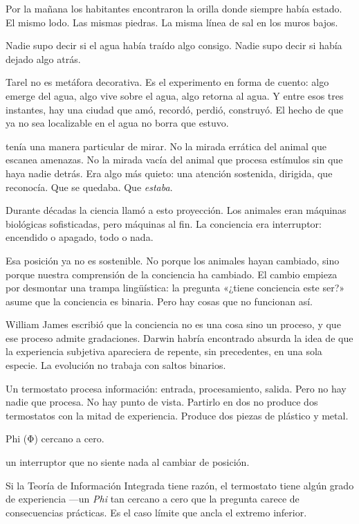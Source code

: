 Por la mañana los habitantes encontraron la orilla donde siempre había estado. El mismo lodo. Las mismas piedras. La misma línea de sal en los muros bajos.

Nadie supo decir si el agua había traído algo consigo. Nadie supo decir si había dejado algo atrás.

\begin{fisica}
 Tarel no es metáfora decorativa. Es el experimento en forma de cuento: algo emerge del agua, algo vive sobre el agua, algo retorna al agua. Y entre esos tres instantes, hay una ciudad que amó, recordó, perdió, construyó. El hecho de que ya no sea localizable en el agua no borra que estuvo.
\end{fisica}
\noindent {} tenía una manera particular de mirar. No la mirada errática del animal que escanea amenazas. No la mirada vacía del animal que procesa estímulos sin que haya nadie detrás. Era algo más quieto: una atención sostenida, dirigida, que reconocía. Que se quedaba. Que \emph{estaba}.

Durante décadas la ciencia llamó a esto proyección. Los animales eran máquinas biológicas sofisticadas, pero máquinas al fin. La conciencia era interruptor: encendido o apagado, todo o nada.

Esa posición ya no es sostenible. No porque los animales hayan cambiado, sino porque nuestra comprensión de la conciencia ha cambiado. El cambio empieza por desmontar una trampa lingüística: la pregunta «¿tiene conciencia este ser?» asume que la conciencia es binaria. Pero hay cosas que no funcionan así.

William James escribió que la conciencia no es una cosa sino un proceso, y que ese proceso admite gradaciones. Darwin habría encontrado absurda la idea de que la experiencia subjetiva apareciera de repente, sin precedentes, en una sola especie. La evolución no trabaja con saltos binarios.

\noindent Un termostato procesa información: entrada, procesamiento, salida. Pero no hay nadie que procesa. No hay punto de vista. Partirlo en dos no produce dos termostatos con la mitad de experiencia. Produce dos piezas de plástico y metal.

\begin{fisica}
 Phi (Φ) cercano a cero.

 un interruptor que no siente nada al cambiar de posición.
\end{fisica}
Si la Teoría de Información Integrada tiene razón, el termostato tiene algún grado de experiencia —un \emph{Phi} tan cercano a cero que la pregunta carece de consecuencias prácticas. Es el caso límite que ancla el extremo inferior.

